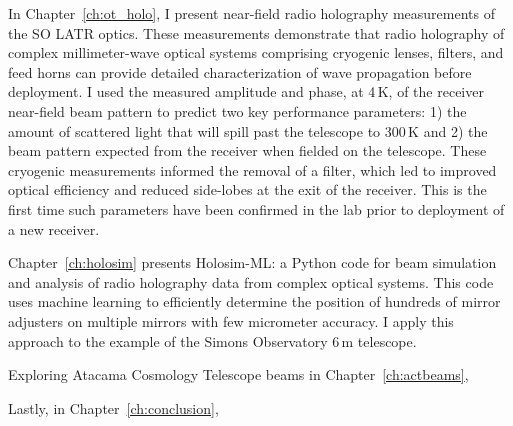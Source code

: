 In Chapter~\ref{ch:ot_holo}, I present near-field radio holography measurements of the SO LATR optics.  These measurements demonstrate that radio holography of complex millimeter-wave optical systems comprising cryogenic lenses, filters, and feed horns can provide detailed characterization of wave propagation before deployment.  I used the measured amplitude and phase, at 4\,K, of the receiver near-field beam pattern to predict two key performance parameters: 1) the amount of scattered light that will spill past the telescope to 300\,K and 2) the beam pattern expected from the receiver when fielded on the telescope.  These cryogenic measurements informed the removal of a filter, which led to improved optical efficiency and reduced side-lobes at the exit of the receiver.  This is the first time such parameters have been confirmed in the lab prior to deployment of a new receiver.

Chapter~\ref{ch:holosim} presents Holosim-ML: a Python code for beam simulation and analysis of radio holography data from complex optical systems.  This code uses machine learning to efficiently determine the position of hundreds of mirror adjusters on multiple mirrors with few micrometer accuracy.  I apply this approach to the example of the Simons Observatory 6\,m telescope.

Exploring Atacama Cosmology Telescope beams in Chapter~\ref{ch:actbeams}, 

Lastly, in Chapter~\ref{ch:conclusion}, 